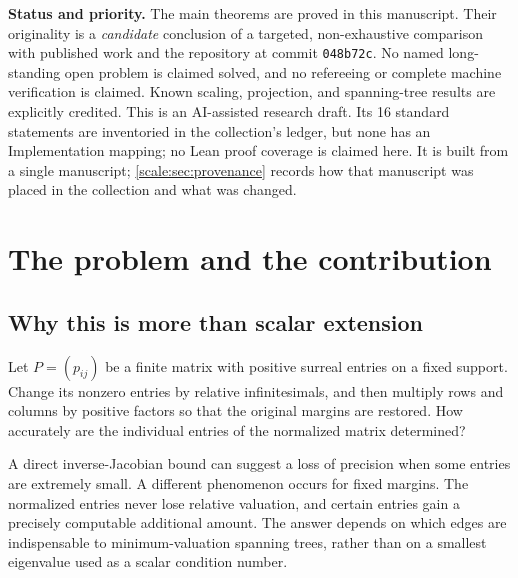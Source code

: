 \documentclass[11pt,a4paper]{article}
\numberwithin{equation}{section}
\theoremstyle{definition}
\newcommand{\shortpin}{048b72c}
\begin{document}
\begin{titlepage}
\begin{abstract}
A tree interpolation identity and a secant reweighting of the exponential
prove the sharp estimate. A separate finite-generator support argument
licenses evaluation at arbitrary rank, where integrality of formal
coefficients alone is insufficient. For a tridiagonal bistochastic
chain we obtain an exact nonlinear propagation law: valuation gains add
along consecutive links. We also give a real-linear-constraint
extension, an unramified local descent statement, explicit examples,
and exact finite verification programs.
\end{abstract}
\vfill
\noindent\small\textbf{Status and priority.}
The main theorems are proved in this manuscript. Their originality is a
\emph{candidate} conclusion of a targeted, non-exhaustive comparison with
published work and the repository at commit \texttt{\shortpin}.
No named long-standing open problem is claimed solved, and no refereeing
or complete machine verification is claimed. Known scaling, projection,
and spanning-tree results are explicitly credited.
This is an AI-assisted research draft. Its 16 standard statements are
inventoried in the collection's ledger, but none has an Implementation mapping;
no Lean proof coverage is claimed here. It is built from a single
manuscript; \cref{scale:sec:provenance} records how that manuscript was
placed in the collection and what was changed.
\end{titlepage}
\hypersetup{pageanchor=true}

\tableofcontents
\clearpage
{}

\section{The problem and the contribution}\label{scale:sec:intro}

\subsection{Why this is more than scalar extension}
Let $P=(p_{ij})$ be a finite matrix with positive surreal entries on a
fixed support. Change its nonzero entries by relative infinitesimals,
and then multiply rows and columns by positive factors so that the
original margins are restored. How accurately are the individual
entries of the normalized matrix determined?

A direct inverse-Jacobian bound can suggest a loss of precision when
some entries are extremely small. A different phenomenon occurs for
fixed margins. The normalized entries never lose relative valuation,
and certain entries gain a precisely computable additional amount.
The answer depends on which edges are indispensable to
minimum-valuation spanning trees, rather than on a smallest eigenvalue
used as a scalar condition number.
\end{document}
